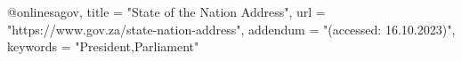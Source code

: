 @online{sagov,
    title = "State of the Nation Address",
    url  = "https://www.gov.za/state-nation-address",
    addendum = "(accessed: 16.10.2023)",
    keywords = "President,Parliament"
}